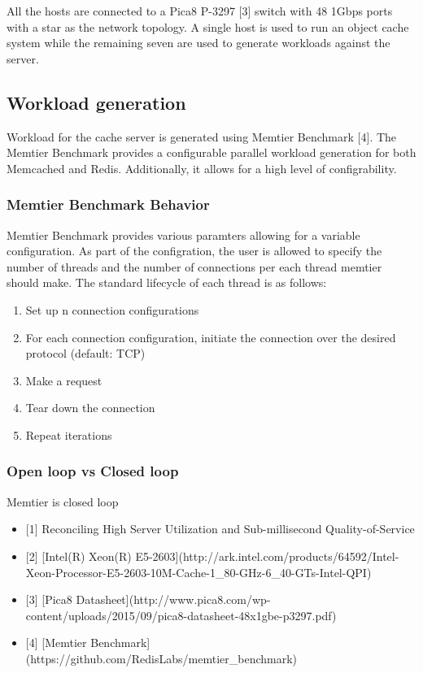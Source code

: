 All the hosts are connected to a Pica8 P-3297 {[}3{]} switch with 48
1Gbps ports with a star as the network topology. A single host is used
to run an object cache system while the remaining seven are used to
generate workloads against the server.

\subsection{Workload generation}\label{workload-generation}

Workload for the cache server is generated using Memtier Benchmark
{[}4{]}. The Memtier Benchmark provides a configurable parallel workload
generation for both Memcached and Redis. Additionally, it allows for a
high level of configrability.

\subsubsection{Memtier Benchmark
Behavior}\label{memtier-benchmark-behavior}

Memtier Benchmark provides various paramters allowing for a variable
configuration. As part of the configration, the user is allowed to
specify the number of threads and the number of connections per each
thread memtier should make. The standard lifecycle of each thread is as
follows:

\begin{enumerate}
\def\labelenumi{\arabic{enumi}.}
\tightlist
\item
  Set up n connection configurations
\item
  For each connection configuration, initiate the connection over the
  desired protocol (default: TCP)
\item
  Make a request
\item
  Tear down the connection
\item
  Repeat iterations
\end{enumerate}

\subsubsection{Open loop vs Closed loop}\label{open-loop-vs-closed-loop}

Memtier is closed loop

\begin{itemize}
\tightlist
\item
  {[}1{]} Reconciling High Server Utilization and Sub-millisecond
  Quality-of-Service
\item
  {[}2{]} {[}Intel(R) Xeon(R)
  E5-2603{]}(http://ark.intel.com/products/64592/Intel-Xeon-Processor-E5-2603-10M-Cache-1\_80-GHz-6\_40-GTs-Intel-QPI)
\item
  {[}3{]} {[}Pica8
  Datasheet{]}(http://www.pica8.com/wp-content/uploads/2015/09/pica8-datasheet-48x1gbe-p3297.pdf)
\item
  {[}4{]} {[}Memtier
  Benchmark{]}(https://github.com/RedisLabs/memtier\_benchmark)
\end{itemize}

